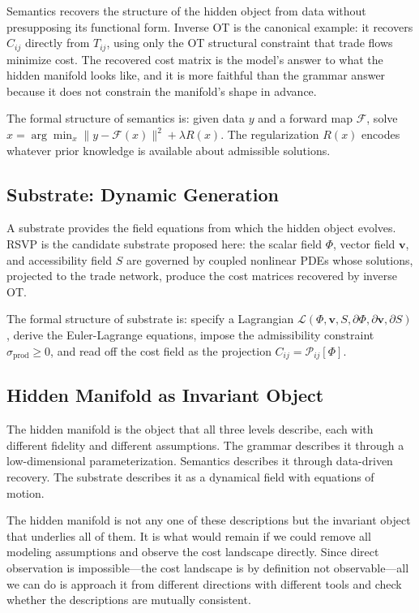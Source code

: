 \documentclass[12pt]{article}
\newcommand{\sigprod}{\sigma_{\mathrm{prod}}}
\begin{document}
Semantics recovers the structure of the hidden object from data without presupposing its functional form. Inverse OT is the canonical example: it recovers $C_{ij}$ directly from $T_{ij}$, using only the OT structural constraint that trade flows minimize cost. The recovered cost matrix is the model's answer to what the hidden manifold looks like, and it is more faithful than the grammar answer because it does not constrain the manifold's shape in advance.

The formal structure of semantics is: given data $y$ and a forward map $\mathcal{F}$, solve $\hat x = \arg\min_x \|y - \mathcal{F}(x)\|^2 + \lambda R(x)$. The regularization $R(x)$ encodes whatever prior knowledge is available about admissible solutions.

\subsection{Substrate: Dynamic Generation}

A substrate provides the field equations from which the hidden object evolves. RSVP is the candidate substrate proposed here: the scalar field $\Phi$, vector field $\mathbf{v}$, and accessibility field $S$ are governed by coupled nonlinear PDEs whose solutions, projected to the trade network, produce the cost matrices recovered by inverse OT.

The formal structure of substrate is: specify a Lagrangian $\mathcal{L}(\Phi, \mathbf{v}, S, \partial\Phi, \partial\mathbf{v}, \partial S)$, derive the Euler-Lagrange equations, impose the admissibility constraint $\sigprod \geq 0$, and read off the cost field as the projection $C_{ij} = \mathcal{P}_{ij}[\Phi]$.

\subsection{Hidden Manifold as Invariant Object}

The hidden manifold is the object that all three levels describe, each with different fidelity and different assumptions. The grammar describes it through a low-dimensional parameterization. Semantics describes it through data-driven recovery. The substrate describes it as a dynamical field with equations of motion.

The hidden manifold is not any one of these descriptions but the invariant object that underlies all of them. It is what would remain if we could remove all modeling assumptions and observe the cost landscape directly. Since direct observation is impossible---the cost landscape is by definition not observable---all we can do is approach it from different directions with different tools and check whether the descriptions are mutually consistent.
\end{document}
